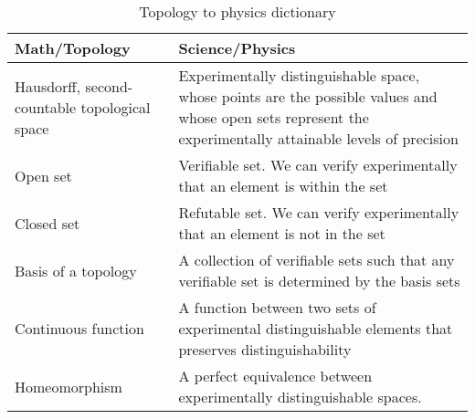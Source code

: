 \documentclass[review]{elsarticle}
\theoremstyle{plain}%
\theoremstyle{definition}
\theoremstyle{remark}
\begin{document}
\begin{table}[h]
	\centering
\begin{tabular}{p{} p{}}
	Math/Topology & Science/Physics \\ 
	\hline 
	Hausdorff, second-countable topological space & Experimentally distinguishable space, whose points are the possible values and whose open sets represent the experimentally attainable levels of precision \\
	Open set & Verifiable set. We can verify experimentally that an element is within the set  \\ 
	Closed set & Refutable set. We can verify experimentally that an element is not in the set \\ 
	Basis of a topology & A collection of verifiable sets such that any verifiable set is determined by the basis sets\\
	Continuous \newline function &  A function between two sets of experimental distinguishable elements that preserves distinguishability \\
	Homeomorphism &  A perfect equivalence between experimentally distinguishable spaces. \\
\end{tabular} 
\caption{Topology to physics dictionary}
\end{table}




\end{document}

